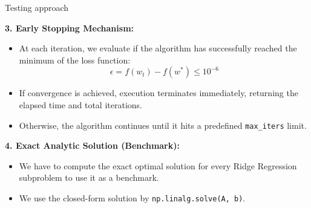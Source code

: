 \documentclass[10pt]{beamer}
\begin{document}
\begin{frame}{Testing approach}

    \vspace{0.2cm}
    \textbf{3. Early Stopping Mechanism:}\\
    \begin{itemize}
        \item At each iteration, we evaluate if the algorithm has successfully reached the minimum of the loss function: $$ \epsilon = f(w_t) - f(w^*) \le 10^{-6}$$
        \item If convergence is achieved, execution terminates immediately, returning the elapsed time and total iterations.
        \item Otherwise, the algorithm continues until it hits a predefined \texttt{max\_iters} limit.
    \end{itemize}

    \vspace{0.2cm}
    \textbf{4. Exact Analytic Solution (Benchmark):}\\
    \begin{itemize}
        \item We have to compute the exact optimal solution for every Ridge Regression subproblem to use it as a benchmark.
        \item We use the closed-form solution by \texttt{np.linalg.solve(A, b)}. 
    \end{itemize}

     \begin{table}[]
        \centering
    \end{table}

\end{frame}
\end{document}
